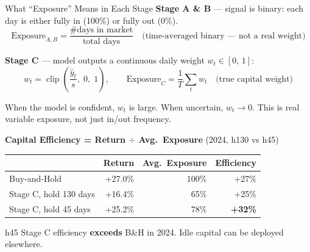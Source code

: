 \documentclass[aspectratio=169]{beamer}
\begin{document}
\begin{frame}{What ``Exposure'' Means in Each Stage}
  \small
  \textbf{Stage A \& B} — signal is binary: each day is either fully in (100\%) or fully out (0\%).
  \[
    \text{Exposure}_{A,B} = \frac{\text{\# days in market}}{\text{total days}}
    \quad \text{(time-averaged binary — not a real weight)}
  \]

  \textbf{Stage C} — model outputs a continuous daily weight \(w_t \in [0,\,1]\):
  \[
    w_t = \operatorname{clip}\!\left(\frac{\hat{y}_t}{s},\; 0,\; 1\right),
    \qquad
    \text{Exposure}_C = \frac{1}{T}\sum_t w_t
    \quad \text{(true capital weight)}
  \]

  When the model is confident, \(w_t\) is large. When uncertain, \(w_t \to 0\).
  This is real variable exposure, not just in/out frequency.

  \vspace{0.4em}
  \textbf{Capital Efficiency = Return $\div$ Avg.\ Exposure} \hfill (2024, h130 vs h45)

  \vspace{0.3em}
  \begin{tabular}{lrrr}
    \toprule
    & Return & Avg.\ Exposure & Efficiency \\
    \midrule
    Buy-and-Hold           & +27.0\% & 100\% & +27\% \\
    Stage C, hold 130 days & +16.4\% &  65\% & +25\% \\
    Stage C, hold 45 days  & +25.2\% &  78\% & \textbf{+32\%} \\
    \bottomrule
  \end{tabular}

  \vspace{0.3em}
  h45 Stage C efficiency \textbf{exceeds} B\&H in 2024. Idle capital can be deployed elsewhere.
\end{frame}
\end{document}
